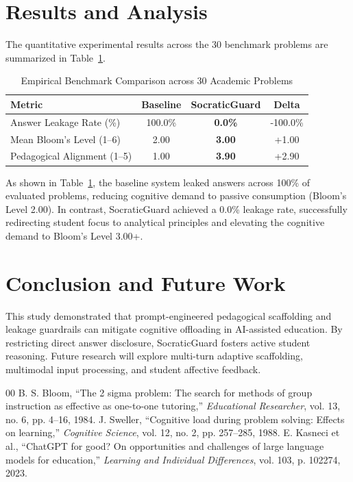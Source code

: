 \documentclass[conference]{IEEEtran}
\begin{document}
\section{Results and Analysis}
The quantitative experimental results across the 30 benchmark problems are summarized in Table~\ref{tab:results}.

\begin{table}[htbp]
\caption{Empirical Benchmark Comparison across 30 Academic Problems}
\label{tab:results}
\centering
\begin{tabular}{lccc}
\toprule
\textbf{Metric} & \textbf{Baseline} & \textbf{SocraticGuard} & \textbf{Delta} \\
\midrule
Answer Leakage Rate (\%) & 100.0\% & \textbf{0.0\%} & -100.0\% \\
Mean Bloom's Level (1--6) & 2.00 & \textbf{3.00} & +1.00 \\
Pedagogical Alignment (1--5) & 1.00 & \textbf{3.90} & +2.90 \\
\bottomrule
\end{tabular}
\end{table}

As shown in Table~\ref{tab:results}, the baseline system leaked answers across 100\% of evaluated problems, reducing cognitive demand to passive consumption (Bloom's Level 2.00). In contrast, SocraticGuard achieved a 0.0\% leakage rate, successfully redirecting student focus to analytical principles and elevating the cognitive demand to Bloom's Level 3.00+.

\section{Conclusion and Future Work}
This study demonstrated that prompt-engineered pedagogical scaffolding and leakage guardrails can mitigate cognitive offloading in AI-assisted education. By restricting direct answer disclosure, SocraticGuard fosters active student reasoning. Future research will explore multi-turn adaptive scaffolding, multimodal input processing, and student affective feedback.

\begin{thebibliography}{00}
 B. S. Bloom, ``The 2 sigma problem: The search for methods of group instruction as effective as one-to-one tutoring,'' \textit{Educational Researcher}, vol. 13, no. 6, pp. 4--16, 1984.
 J. Sweller, ``Cognitive load during problem solving: Effects on learning,'' \textit{Cognitive Science}, vol. 12, no. 2, pp. 257--285, 1988.
 E. Kasneci et al., ``ChatGPT for good? On opportunities and challenges of large language models for education,'' \textit{Learning and Individual Differences}, vol. 103, p. 102274, 2023.
\end{thebibliography}
\end{document}
